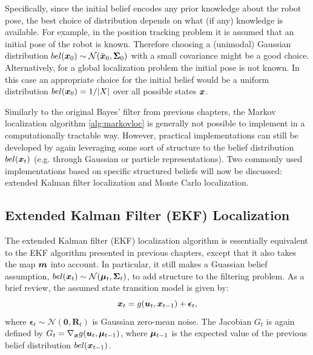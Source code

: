 Specifically, since the initial belief encodes any prior knowledge about the robot pose, the best choice of distribution depends on what (if any) knowledge is available. For example, in the position tracking problem it is assumed that an initial pose of the robot is known. Therefore choosing a (unimodal) Gaussian distribution $bel(\bm{x}_0) \sim \mathcal{N}(\bar{\bm{x}}_0, \bm{\Sigma}_0)$ with a small covariance might be a good choice. Alternatively, for a global localization problem the initial pose is not known. In this case an appropriate choice for the initial belief would be a uniform distribution $bel(\bm{x}_0) = 1/\lvert X \rvert$ over all possible states $\bm{x}$.

Similarly to the original Bayes' filter from previous chapters, the Markov localization algorithm \ref{alg:markovloc} is generally not possible to implement in a computationally tractable way. However, practical implementations can still be developed by again leveraging some sort of structure to the belief distribution $bel(\bm{x}_t)$ (e.g. through Gaussian or particle representations). Two commonly used implementations based on specific structured beliefs will now be discussed: extended Kalman filter localization and Monte Carlo localization.


\subsection{Extended Kalman Filter (EKF) Localization}
The extended Kalman filter (EKF) localization algorithm is essentially equivalent to the EKF algorithm presented in previous chapters, except that it also takes the map $\bm{m}$ into account. In particular, it still makes a Guassian belief assumption, $bel(\bm{x}_t) \sim \mathcal{N}(\bm{\mu}_t, \bm{\Sigma}_t)$, to add structure to the filtering problem. As a brief review, the assumed state transition model is given by:
\begin{equation*}
\bm{x}_t = g(\bm{u}_t, \bm{x}_{t-1}) + \bm{\epsilon}_t,
\end{equation*}
where $\bm{\epsilon}_t \sim \mathcal{N}(\bm{0}, \bm{R}_t)$ is Gaussian zero-mean noise. The Jacobian $G_t$ is again defined by $G_t = \nabla_{\bm{x}}g(\bm{u}_t, \bm{\mu}_{t-1})$, where $\bm{\mu}_{t-1}$ is the expected value of the previous belief distribution $bel(\bm{x}_{t-1})$. 

